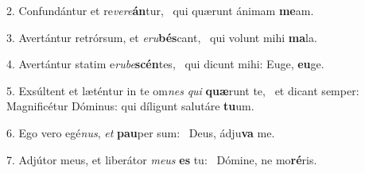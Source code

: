 2. Confundántur et re\textit{ve}\textit{re}\textbf{án}tur, \ast\  qui quærunt ánimam \textbf{me}am.\

3. Avertántur retrórsum, et \textit{e}\textit{ru}\textbf{bés}cant, \ast\  qui volunt mihi \textbf{ma}la.\

4. Avertántur statim e\textit{ru}\textit{be}\textbf{scén}tes, \ast\  qui dicunt mihi: Euge, \textbf{eu}ge.\

5. Exsúltent et læténtur in te om\textit{nes} \textit{qui} \textbf{quæ}runt te, \ast\  et dicant semper: Magnificétur Dóminus: qui díligunt salutáre \textbf{tu}um.\

6. Ego vero egé\textit{nus}, \textit{et} \textbf{pau}per sum: \ast\  Deus, ádju\textbf{va} me.\

7. Adjútor meus, et liberátor \textit{me}\textit{us} \textbf{es} tu: \ast\  Dómine, ne mo\textbf{ré}ris.\

